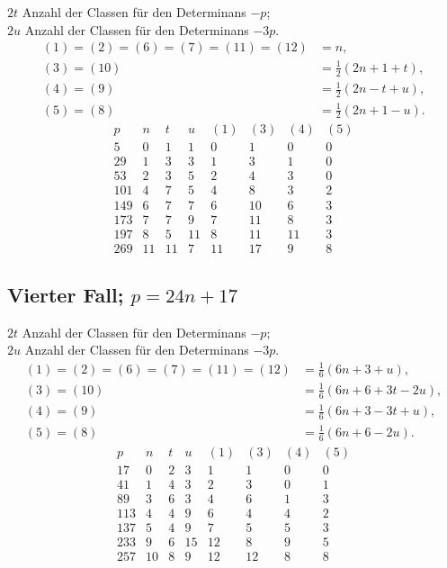 \documentclass[12pt]{article}
\begin{document}
$2t$ Anzahl der Classen für den Determinans $-p$;\\
$2u$ Anzahl der Classen für den Determinans $-3p$.
\[
\begin{aligned}
(1)=(2)=(6)=(7)=(11)=(12)&=n,\\
(3)=(10)&=\frac12(2n+1+t),\\
(4)=(9)&=\frac12(2n-t+u),\\
(5)=(8)&=\frac12(2n+1-u).
\end{aligned}
\]
\[
\begin{array}{r|r|r|r|r|r|r|r}
p&n&t&u&(1)&(3)&(4)&(5)\\\hline
5&0&1&1&0&1&0&0\\
29&1&3&3&1&3&1&0\\
53&2&3&5&2&4&3&0\\
101&4&7&5&4&8&3&2\\
149&6&7&7&6&10&6&3\\
173&7&7&9&7&11&8&3\\
197&8&5&11&8&11&11&3\\
269&11&11&7&11&17&9&8
\end{array}
\]

\subsection*{Vierter Fall; \(p=24n+17\)}

$2t$ Anzahl der Classen für den Determinans $-p$;\\
$2u$ Anzahl der Classen für den Determinans $-3p$.
\[
\begin{aligned}
(1)=(2)=(6)=(7)=(11)=(12)&=\frac16(6n+3+u),\\
(3)=(10)&=\frac16(6n+6+3t-2u),\\
(4)=(9)&=\frac16(6n+3-3t+u),\\
(5)=(8)&=\frac16(6n+6-2u).
\end{aligned}
\]
\[
\begin{array}{r|r|r|r|r|r|r|r}
p&n&t&u&(1)&(3)&(4)&(5)\\\hline
17&0&2&3&1&1&0&0\\
41&1&4&3&2&3&0&1\\
89&3&6&3&4&6&1&3\\
113&4&4&9&6&4&4&2\\
137&5&4&9&7&5&5&3\\
233&9&6&15&12&8&9&5\\
257&10&8&9&12&12&8&8
\end{array}
\]
\end{document}
